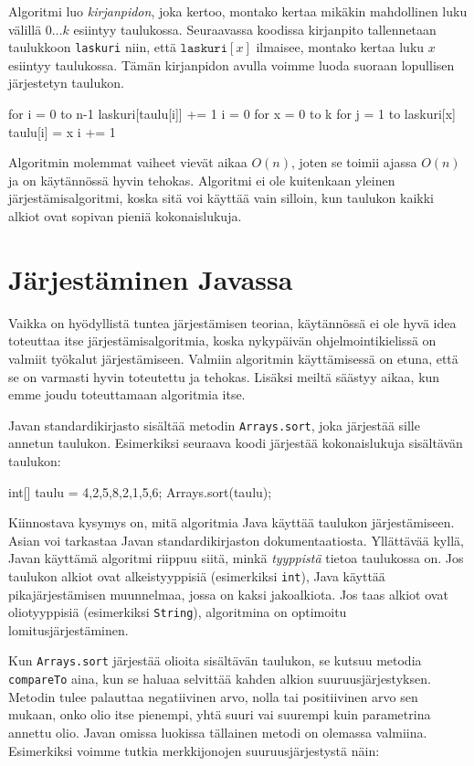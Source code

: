Algoritmi luo \emph{kirjanpidon}, joka kertoo,
montako kertaa mikä\-kin mahdollinen luku välillä $0 \dots k$
esiintyy taulukossa.
Seuraavassa koodissa kirjanpito tallennetaan
taulukkoon \texttt{laskuri} niin, että
$\texttt{laskuri}[x]$ ilmaisee,
montako kertaa luku $x$ esiintyy taulukossa.
Tämän kirjanpidon avulla voimme luoda suoraan
lopullisen järjestetyn taulukon.

\begin{code}
for i = 0 to n-1
    laskuri[taulu[i]] += 1
i = 0
for x = 0 to k
    for j = 1 to laskuri[x]
        taulu[i] = x
        i += 1
\end{code}

Algoritmin molemmat vaiheet vievät aikaa $O(n)$,
joten se toimii ajassa $O(n)$ ja on käytännössä hyvin tehokas.
Algoritmi ei ole kuitenkaan yleinen järjestämisalgoritmi,
koska sitä voi käyttää vain silloin,
kun taulukon kaikki alkiot ovat sopivan pieniä kokonaislukuja.


\section{Järjestäminen Javassa}

Vaikka on hyödyllistä tuntea järjestämisen teoriaa,
käytännössä ei ole hyvä idea toteuttaa itse
järjestämisalgoritmia, koska nykypäivän ohjelmointikielissä
on valmiit työkalut järjestämiseen.
Valmiin algoritmin käyttämisessä on etuna,
että se on varmasti hyvin toteutettu ja tehokas.
Lisäksi meiltä säästyy aikaa, kun emme joudu
toteuttamaan algoritmia itse.

Javan standardikirjasto sisältää metodin \texttt{Arrays.sort},
joka järjestää sille annetun taulukon.
Esimerkiksi seuraava koodi järjestää kokonaislukuja
sisältävän taulukon:

\begin{code}
int[] taulu = {4,2,5,8,2,1,5,6};
Arrays.sort(taulu);
\end{code}

Kiinnostava kysymys on, mitä algoritmia Java käyttää
taulukon järjes\-tämiseen.
Asian voi tarkastaa Javan standardikirjaston
dokumentaatiosta.
Yllättävää kyllä, Javan käyttämä algoritmi riippuu siitä,
minkä \emph{tyyppistä} tietoa taulukossa on.
Jos taulukon alkiot ovat alkeistyyppisiä
(esimerkiksi \texttt{int}), Java käyttää 
pikajärjestämisen muunnelmaa,
jossa on kaksi jakoalkiota.
Jos taas alkiot ovat oliotyyppisiä
(esimerkiksi \texttt{String}),
algoritmina on optimoitu lomitusjärjestäminen.

Kun \texttt{Arrays.sort} järjestää olioita sisältävän taulukon,
se kutsuu metodia \texttt{compareTo} aina, kun se haluaa selvittää
kahden alkion suuruusjärjestyksen.
Metodin tulee palauttaa negatiivinen arvo, nolla tai positiivinen arvo
sen mukaan, onko olio itse pienempi, yhtä suuri vai suurempi
kuin parametrina annettu olio.
Javan omissa luokissa tällainen metodi on olemassa valmiina.
Esimerkiksi voimme tutkia merkkijonojen suuruusjärjestystä näin:

